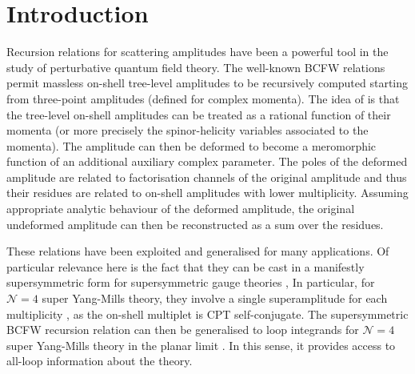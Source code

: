 \documentclass[12pt]{article}
\numberwithin{equation}{section}
\begin{document}
\section{Introduction}

Recursion relations for scattering amplitudes have been a powerful tool in the study of perturbative quantum field theory. The well-known BCFW relations \cite{Britto:2004ap,Britto:2005fq} permit massless on-shell tree-level amplitudes to be recursively computed starting from three-point amplitudes (defined for complex momenta). The idea of \cite{Britto:2005fq} is that the tree-level on-shell amplitudes can be treated as a rational function of their momenta (or more precisely the spinor-helicity variables associated to the momenta). The amplitude can then be deformed to become a meromorphic function of an additional auxiliary complex parameter. The poles of the deformed amplitude are related to factorisation channels of the original amplitude and thus their residues are related to on-shell amplitudes with lower multiplicity. Assuming appropriate analytic behaviour of the deformed amplitude, the original undeformed amplitude can then be reconstructed as a sum over the residues.

These relations have been exploited and generalised for many applications. Of particular relevance here is the fact that they can be cast in a manifestly supersymmetric form for supersymmetric gauge theories \cite{Brandhuber:2008pf,Arkani-Hamed:2008owk}, In particular, for $\mathcal{N}=4$ super Yang-Mills theory, they involve a single superamplitude for each multiplicity \cite{Nair:1988bq}, as the on-shell multiplet is CPT self-conjugate. The supersymmetric BCFW recursion relation can then be generalised to loop integrands for $\mathcal{N}=4$ super Yang-Mills theory in the planar limit \cite{Arkani-Hamed:2010zjl}. In this sense, it provides access to all-loop information about the theory. 
\end{document}
